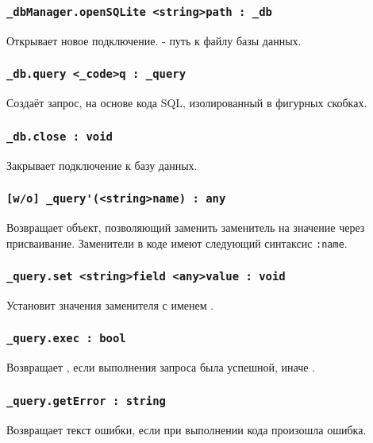 \documentclass[a4paper, 14pt]{extarticle}
\begin{document}
\subsubsection{\lstinline|_dbManager.openSQLite <string>path : _db|}

Открывает новое подключение.  - путь к файлу базы данных.

\subsubsection{\lstinline|_db.query <_code>q : _query|}

Создаёт запрос, на основе кода SQL, изолированный в фигурных скобках.

\subsubsection{\lstinline|_db.close : void|}

Закрывает подключение к базу данных.

\subsubsection{\lstinline|[w/o] _query'(<string>name) : any|}

Возвращает объект, позволяющий заменить заменитель на значение через присваивание. Заменители в коде имеют следующий синтаксис \lstinline|:name|.

\subsubsection{\lstinline|_query.set <string>field <any>value : void|}

Установит значения заменителя с именем .

\subsubsection{\lstinline|_query.exec : bool|}

Возвращает \true, если выполнения запроса была успешной, иначе \false.

\subsubsection{\lstinline|_query.getError : string|}

Возвращает текст ошибки, если при выполнении кода произошла ошибка.
\end{document}
